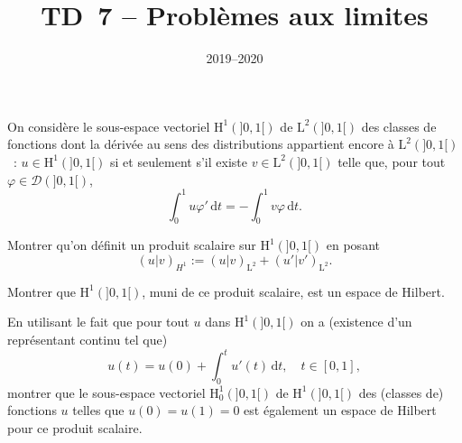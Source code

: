 \documentclass[11pt,a4paper]{article}
\title{TD~7 -- Probl\`emes aux limites}
\date{2019--2020}
\def\L{\mathrm{L}}
\def\H{\mathrm{H}}
\def\DD{\mathscr{D}}
\def\d{\mathrm{d}}
\def\vphi{\varphi}
\begin{document}
\maketitle

\begin{Exercice} On consid\`ere le sous-espace vectoriel $\H^1(]0,1[)$ de $\L^2(]0,1[)$
des classes de fonctions dont la d\'eriv\'ee au sens des distributions appartient
encore \`a $\L^2(]0,1[)$~: $u \in \H^1(]0,1[)$ si et seulement s'il existe $v \in
\L^2(]0,1[)$ telle que, pour tout $\vphi \in \DD(]0,1[)$,
\[ \int_0^1 u\vphi'\,\d t =-\int_0^1 v\vphi\,\d t. \]

\begin{Question} Montrer qu'on d\'efinit un produit scalaire sur $\H^1(]0,1[)$ en
posant
\[ (u|v)_{H^1} := (u|v)_{\L^2}+(u'|v')_{\L^2}. \]
\end{Question}

\begin{Question} Montrer que $\H^1(]0,1[)$, muni de ce produit scalaire, est un espace
de Hilbert.
\end{Question}

\begin{Question} En utilisant le fait que pour tout $u$ dans $\H^1(]0,1[)$
on a (existence d'un repr\'esentant continu tel que)
\[ u(t) = u(0) + \int_0^t u'(t)\,\d t,\quad t \in [0,1], \]
montrer que le sous-espace vectoriel $\H^1_0(]0,1[)$ de $\H^1(]0,1[)$ des (classes de)
fonctions $u$ telles que $u(0)=u(1)=0$ est \'egalement un espace de Hilbert pour ce
produit scalaire.
\end{Question}

\end{Exercice} \vspace*{1em}
\end{document}
